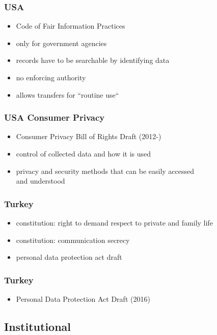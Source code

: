 \documentclass[dvipsnames]{beamer}
\theoremstyle{plain}
\begin{document}
\begin{frame}
  \frametitle{USA}

  \begin{itemize}
    \item Code of Fair Information Practices
    \smallskip
    \item only for government agencies
    \item records have to be searchable by identifying data
    \item no enforcing authority
    \item allows transfers for ``routine use``
  \end{itemize}
\end{frame}

\begin{frame}
  \frametitle{USA Consumer Privacy}

  \begin{itemize}
    \item Consumer Privacy Bill of Rights Draft (2012-)
    \smallskip
    \item control of collected data and how it is used
    \item privacy and security methods that can be easily accessed\\
      and understood
  \end{itemize}
\end{frame}

\begin{frame}
  \frametitle{Turkey}

  \begin{itemize}
    \item constitution: right to demand respect to private and family life
    \item constitution: communication secrecy
    \item personal data protection act draft
  \end{itemize}
\end{frame}

\begin{frame}
  \frametitle{Turkey}

  \begin{itemize}
    \item Personal Data Protection Act Draft (2016)
  \end{itemize}
\end{frame}

\subsection{Institutional}
\end{document}
